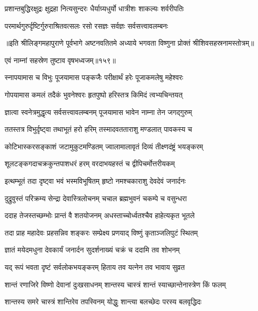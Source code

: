 \twolineshloka
{प्रशान्तबुद्धिरक्षुद्रः क्षुद्रहा नित्यसुन्दरः}
{धैर्याग्र्यधुर्यो धात्रीशः शाकल्यः शर्वरीपतिः}

\twolineshloka
{परमार्थगुरुर्दृष्टिर्गुरुराश्रितवत्सलः}
{रसो रसज्ञः सर्वज्ञः सर्वसत्त्वावलम्बनः}


॥इति श्रीलिङ्गमहापुराणे पूर्वभागे अष्टनवतितमे अध्याये भगवता विष्णुना प्रोक्तं श्रीशिवसहस्रनामस्तोत्रम्॥


{एवं नाम्नां सहस्रेण तुष्टाव वृषभध्वजम्॥१५९॥}%

\resetShloka
\addtocounter{shlokacount}{159}


\twolineshloka
{स्नापयामास च विभुः पूजयामास पङ्कजैः}
{परीक्षार्थं हरेः पूजाकमलेषु महेश्वरः}%

\twolineshloka
{गोपयामास कमलं तदैकं भुवनेश्वरः}
{हृतपुष्पो हरिस्तत्र किमिदं त्वभ्यचिन्तयत्}%

\twolineshloka
{ज्ञात्वा स्वनेत्रमुद्धृत्य सर्वसत्त्वावलम्बनम्}
{पूजयामास भावेन नाम्ना तेन जगद्गुरुम्}%

\twolineshloka
{ततस्तत्र विभुर्दृष्ट्वा तथाभूतं हरो हरिम्}
{तस्मादवतताराशु मण्डलात् पावकस्य च}%

\twolineshloka
{कोटिभास्करसङ्काशं जटामुकुटमण्डितम्}
{ज्वालामालावृतं दिव्यं तीक्ष्णदंष्ट्रं भयङ्करम्}%

\twolineshloka
{शूलटङ्कगदाचक्रकुन्तपाशधरं हरम्}
{वरदाभयहस्तं च द्वीपिचर्मोत्तरीयकम्}%

\twolineshloka
{इत्थम्भूतं तदा दृष्ट्वा भवं भस्मविभूषितम्}
{हृष्टो नमश्चकाराशु देवदेवं जनार्दनः}%

\twolineshloka
{दुद्रुवुस्तं परिक्रम्य सेन्द्रा देवास्त्रिलोचनम्}
{चचाल ब्रह्मभुवनं चकम्पे च वसुन्धरा}%

\twolineshloka
{ददाह तेजस्तच्छम्भोः प्रान्तं वै शतयोजनम्}
{अधस्ताच्चोर्ध्वतश्चैव हाहेत्यकृत भूतले}%

\twolineshloka
{तदा प्राह महादेवः प्रहसन्निव शङ्करः}
{सम्प्रेक्ष्य प्रणयाद् विष्णुं कृताञ्जलिपुटं स्थितम्}%

\twolineshloka
{ज्ञातं मयेदमधुना देवकार्यं जनार्दन}
{सुदर्शनाख्यं चक्रं च ददामि तव शोभनम्}%

\twolineshloka
{यद् रूपं भवता दृष्टं सर्वलोकभयङ्करम्}
{हिताय तव यत्नेन तव भावाय सुव्रत}%

\twolineshloka
{शान्तं रणाजिरे विष्णो देवानां दुःखसाधनम्}
{शान्तस्य चास्त्रं शान्तं स्याच्छान्तेनास्त्रेण किं फलम्}%

\twolineshloka
{शान्तस्य समरे चास्त्रं शान्तिरेव तपस्विनम्}
{योद्धुः शान्त्या बलच्छेदः परस्य बलवृद्धिदः}%

